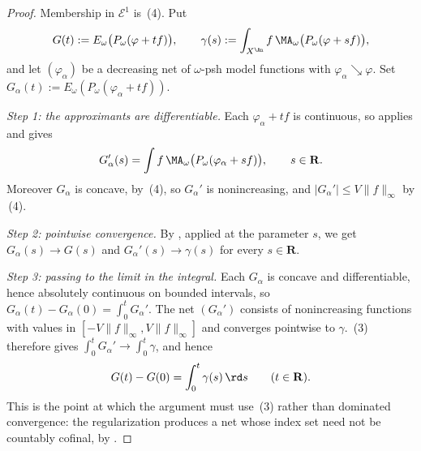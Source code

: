 \begin{proof}
Membership in \(\mathcal E^1\) is
\,(4).  Put
\[
 G(t):=E_\omega\bigl(P_\omega(\varphi+tf)\bigr),
 \qquad
 \gamma(s):=\int_{X^{\An}}f\,
     \MA_\omega\bigl(P_\omega(\varphi+sf)\bigr),
\]
and let \((\varphi_\alpha)\) be a decreasing net of \(\omega\)-psh model
functions with \(\varphi_\alpha\searrow\varphi\).  Set
\(G_\alpha(t):=E_\omega(P_\omega(\varphi_\alpha+tf))\).

\emph{Step 1: the approximants are differentiable.}
Each \(\varphi_\alpha+tf\) is continuous, so
 applies and gives
\[
 G_\alpha'(s)=\int f\,
   \MA_\omega\bigl(P_\omega(\varphi_\alpha+sf)\bigr),
 \qquad s\in\mathbf R .
\]
Moreover \(G_\alpha\) is concave, by
\,(4), so \(G_\alpha'\) is nonincreasing, and
\(|G_\alpha'|\leq V\lVert f\rVert_\infty\) by
\,(4).

\emph{Step 2: pointwise convergence.}
By , applied at the parameter
\(s\), we get \(G_\alpha(s)\to G(s)\) and \(G_\alpha'(s)\to\gamma(s)\) for
every \(s\in\mathbf R\).

\emph{Step 3: passing to the limit in the integral.}
Each \(G_\alpha\) is concave and differentiable, hence absolutely continuous
on bounded intervals, so \(G_\alpha(t)-G_\alpha(0)=\int_0^tG_\alpha'\).  The
net \((G_\alpha')\) consists of nonincreasing functions with values in
\([-V\lVert f\rVert_\infty,V\lVert f\rVert_\infty]\) and converges
pointwise to \(\gamma\).  \,(3) therefore gives
\(\int_0^tG_\alpha'\to\int_0^t\gamma\), and hence
\begin{equation}\label{eq:ch27-e1-integrated}
 G(t)-G(0)=\int_0^t\gamma(s)\,\rd s
 \qquad(t\in\mathbf R).
\end{equation}
This is the point at which the argument must use
\,(3) rather than dominated convergence: the
regularization  produces a net whose
index set need not be countably cofinal, by
.


\end{proof}
